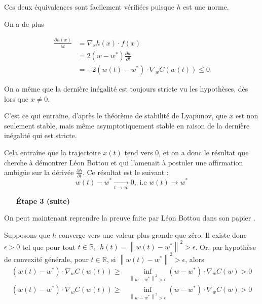 \documentclass{article}
\begin{document}
Ces deux équivalences sont facilement vérifiées puisque $h$ est une norme.
\bigskip

On a de plus 

\begin{equation*}
    \begin{split}
        \frac{\partial h(x)}{\partial t} & = \nabla_xh(x) \cdot f(x) \\
        & = 2(w - w^*) \frac{\partial w}{\partial t} \\
        & = -2(w(t)-w^{*})\cdot\nabla_wC(w(t)) \leq 0  
    \end{split}
\end{equation*}

On a même que la dernière inégalité est toujours stricte vu les hypothèses, dès lors que $x \ne 0$.

C'est ce qui entraîne, d'après le théorème de stabilité de Lyapunov, que $x$ est non seulement stable, mais même asymptotiquement stable en raison de la dernière inégalité qui est stricte. 

Cela entraîne que la trajectoire $x(t)$ tend vers $0$, et on a donc le résultat que cherche à démontrer Léon Bottou et qui l'amenait à postuler une affirmation ambigüe sur la dérivée $\frac{\partial h}{\partial t}$. Ce résultat est le suivant : 
\begin{equation}
    w(t) - w^* \underset{t \rightarrow \infty}{\longrightarrow} 0, \text{ i.e } w(t) \longrightarrow w^*
\end{equation}

\begin{itemize}
    \item [\textbf{Étape 3 (suite)}]
\end{itemize}

On peut maintenant reprendre la preuve faite par Léon Bottou dans son papier \cite{Bottou98on-linelearning}.
\bigskip

Supposons que $h$ converge vers une valeur plus grande que zéro. Il existe donc $\epsilon>0$ tel que pour tout $t\in\mathbb{R},~~h(t)=\left\|w(t)-w^*\right\|^2>\epsilon$. Or, par hypothèse de convexité générale, pour $t\in\mathbb{R}$, si $\left\|w(t)-w^*\right\|^2>\epsilon$, alors
\begin{equation*}
    \begin{split}
        (w(t) - w^{*}) \cdot \nabla_wC(w(t)) \geq & \inf_{\left\|w - w^*\right\|^2>\epsilon} (w - w^{*}) \cdot \nabla_wC(w) > 0 \\
        (w(t) - w^{*})\cdot\nabla_wC(w(t)) \geq & \inf_{\left\|w-w^*\right\|^2>\epsilon} (w-w^{*}) \cdot \nabla_wC(w) > 0
    \end{split}
\end{equation*}
\end{document}
